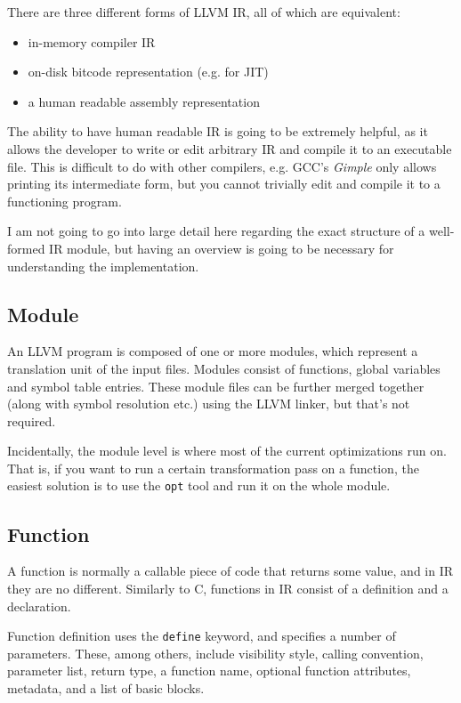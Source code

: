 There are three different forms of LLVM IR, all of which are equivalent:
\begin{itemize}
	\item in-memory compiler IR
	\item on-disk bitcode representation (e.g. for JIT)
	\item a human readable assembly representation
\end{itemize}

The ability to have human readable IR is going to be extremely helpful, as it allows the developer to write or edit arbitrary IR and compile it to an executable file. This is difficult to do with other compilers, e.g. GCC's \emph{Gimple} only allows printing its intermediate form, but you cannot trivially edit and compile it to a functioning program.

I am not going to go into large detail here regarding the exact structure of a well-formed IR module, but having an overview is going to be necessary for understanding the implementation.

\subsection{Module}
An LLVM program is composed of one or more modules, which represent a translation unit of the input files. Modules consist of functions, global variables and symbol table entries. These module files can be further merged together (along with symbol resolution etc.) using the LLVM linker, but that's not required.

Incidentally, the module level is where most of the current optimizations run on. That is, if you want to run a certain transformation pass on a function, the easiest solution is to use the \texttt{opt} tool and run it on the whole module.

\subsection{Function}
A function is normally a callable piece of code that returns some value, and in IR they are no different. Similarly to C, functions in IR consist of a definition and a declaration.

Function definition uses the \texttt{define} keyword, and specifies a number of parameters. These, among others, include visibility style, calling convention, parameter list, return type, a function name, optional function attributes, metadata, and a list of basic blocks.

